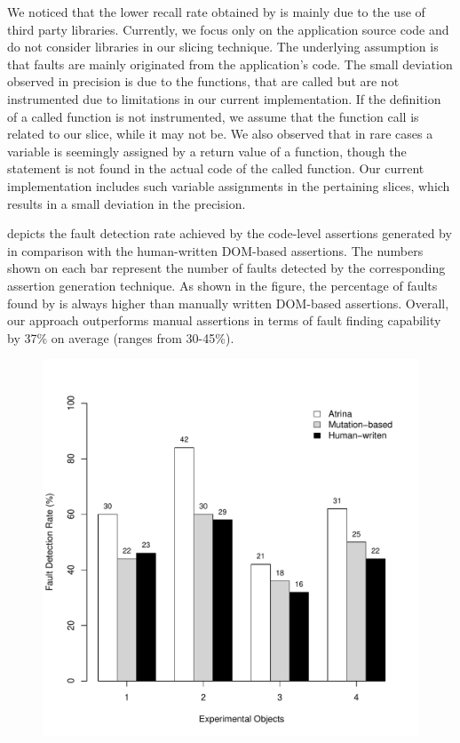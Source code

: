 We noticed that the lower recall rate obtained by \tool is mainly due to the use of third party libraries. Currently, we focus only on the application source code and do not consider libraries in our slicing technique. The underlying assumption is that faults are mainly originated from the application's code. The small deviation observed in precision is due to the functions, that are called but are not instrumented due to limitations in our current implementation. If the definition of a called function is not instrumented, we assume that the function call is related to our slice, while it may not be. We also observed that in rare cases a variable is seemingly assigned by a return value of a function, though the  statement is not found in the actual code of the called function. Our current implementation includes such variable assignments in the pertaining slices, which results in a small deviation in the precision.  

 depicts the fault detection rate achieved by the code-level assertions generated by \tool in comparison with the human-written DOM-based assertions. The numbers shown on each bar represent the number of faults detected by the corresponding assertion generation technique. As shown in the figure, the percentage of faults found by \tool is always higher than manually written DOM-based assertions. Overall, our approach outperforms manual assertions in terms of fault finding capability by 37\% on average (ranges from 30-45\%). 
\begin{figure}[!t]
  \centering
  \includegraphics[width=1\hsize]{r-scripts/barplot-faultDetectionRate}
  \vspace{-0.18in}   
  \vspace{-0.1in} 
  \label{Fig:barplot-faultDetectionRate}

\end{figure}







